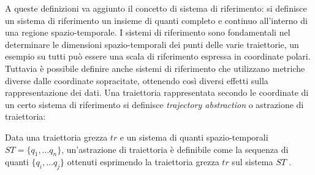 A queste definizioni va aggiunto il concetto di sistema di riferimento: si definisce un sistema di riferimento un insieme di
quanti completo e continuo all'interno di una regione spazio-temporale.
I sistemi di riferimento sono fondamentali nel determinare le dimensioni spazio-temporali dei punti delle varie traiettorie,
un esempio su tutti può essere una scala di riferimento espressa in coordinate polari.
Tuttavia è possibile definire anche sistemi di riferimento che utilizzano metriche diverse dalle coordinate sopracitate,
ottenendo così diversi effetti sulla rappresentazione dei dati.
Una traiettoria rappresentata secondo le coordinate di un certo sistema di riferimento si definisce \textit{trajectory abstraction} o astrazione di traiettoria:

\begin{definition}

  Data una traiettoria grezza \(tr\) e un sistema di quanti spazio-temporali \( ST = \{q_{1},\ldots q_{n}\}\), un'astrazione di traiettoria è definibile come la sequenza di quanti  \( \{q_{i},\ldots q_{j}\}\) ottenuti esprimendo la traiettoria grezza \(tr\) sul sistema \(ST\)  .

\end{definition}

